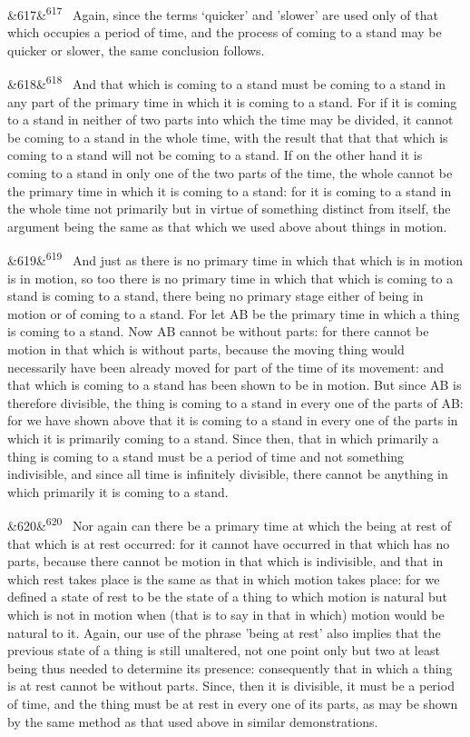 \documentclass[12pt]{article}
\newcommand{\para}[1][]{\par\noindent\ifx&#1&\else\textsuperscript{\footnotesize #1}~\fi}
\begin{document}
\para[617] Again, since the terms ‘quicker' and 'slower' are used only of that which occupies a period of time, and the process of coming to a stand may be quicker or slower, the same conclusion follows.

\para[618] And that which is coming to a stand must be coming to a stand in any part of the primary time in which it is coming to a stand. For if it is coming to a stand in neither of two parts into which the time may be divided, it cannot be coming to a stand in the whole time, with the result that that that which is coming to a stand will not be coming to a stand. If on the other hand it is coming to a stand in only one of the two parts of the time, the whole cannot be the primary time in which it is coming to a stand: for it is coming to a stand in the whole time not primarily but in virtue of something distinct from itself, the argument being the same as that which we used above about things in motion.

\para[619] And just as there is no primary time in which that which is in motion is in motion, so too there is no primary time in which that which is coming to a stand is coming to a stand, there being no primary stage either of being in motion or of coming to a stand. For let AB be the primary time in which a thing is coming to a stand. Now AB cannot be without parts: for there cannot be motion in that which is without parts, because the moving thing would necessarily have been already moved for part of the time of its movement: and that which is coming to a stand has been shown to be in motion. But since AB is therefore divisible, the thing is coming to a stand in every one of the parts of AB: for we have shown above that it is coming to a stand in every one of the parts in which it is primarily coming to a stand. Since then, that in which primarily a thing is coming to a stand must be a period of time and not something indivisible, and since all time is infinitely divisible, there cannot be anything in which primarily it is coming to a stand.

\para[620] Nor again can there be a primary time at which the being at rest of that which is at rest occurred: for it cannot have occurred in that which has no parts, because there cannot be motion in that which is indivisible, and that in which rest takes place is the same as that in which motion takes place: for we defined a state of rest to be the state of a thing to which motion is natural but which is not in motion when (that is to say in that in which) motion would be natural to it. Again, our use of the phrase 'being at rest' also implies that the previous state of a thing is still unaltered, not one point only but two at least being thus needed to determine its presence: consequently that in which a thing is at rest cannot be without parts. Since, then it is divisible, it must be a period of time, and the thing must be at rest in every one of its parts, as may be shown by the same method as that used above in similar demonstrations.
\end{document}
